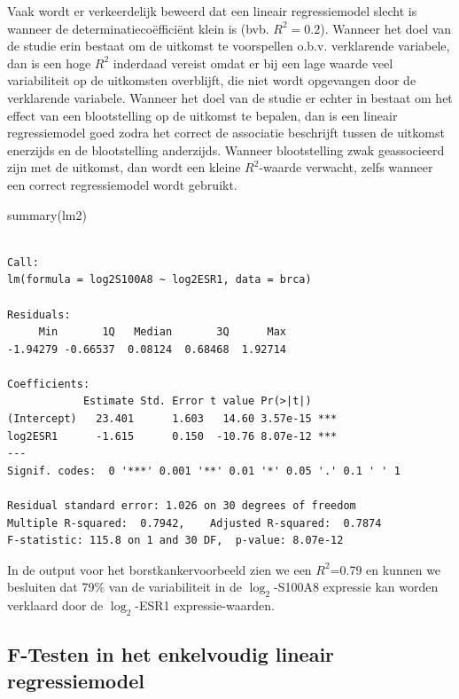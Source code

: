 \documentclass[
  dutch,
  letterpaper,
  12pt]{book}
\newenvironment{Shaded}{\begin{snugshade}}{\end{snugshade}}
\newcommand{\FunctionTok}[1]{\textcolor[rgb]{0.28,0.35,0.67}{#1}}
\newcommand{\NormalTok}[1]{\textcolor[rgb]{0.00,0.23,0.31}{#1}}
\theoremstyle{definition}
\theoremstyle{definition}
\theoremstyle{definition}
\theoremstyle{remark}
\begin{document}
Vaak wordt er verkeerdelijk beweerd dat een lineair regressiemodel
slecht is wanneer de determinatiecoëfficiënt klein is (bvb.
\(R^2=0.2\)). Wanneer het doel van de studie erin bestaat om de uitkomst
te voorspellen o.b.v. verklarende variabele, dan is een hoge \(R^2\)
inderdaad vereist omdat er bij een lage waarde veel variabiliteit op de
uitkomsten overblijft, die niet wordt opgevangen door de verklarende
variabele. Wanneer het doel van de studie er echter in bestaat om het
effect van een blootstelling op de uitkomst te bepalen, dan is een
lineair regressiemodel goed zodra het correct de associatie beschrijft
tussen de uitkomst enerzijds en de blootstelling anderzijds. Wanneer
blootstelling zwak geassocieerd zijn met de uitkomst, dan wordt een
kleine \(R^2\)-waarde verwacht, zelfs wanneer een correct regressiemodel
wordt gebruikt.

\begin{Shaded}
\begin{Highlighting}[]
\FunctionTok{summary}\NormalTok{(lm2)}
\end{Highlighting}
\end{Shaded}

\begin{verbatim}

Call:
lm(formula = log2S100A8 ~ log2ESR1, data = brca)

Residuals:
     Min       1Q   Median       3Q      Max 
-1.94279 -0.66537  0.08124  0.68468  1.92714 

Coefficients:
            Estimate Std. Error t value Pr(>|t|)    
(Intercept)   23.401      1.603   14.60 3.57e-15 ***
log2ESR1      -1.615      0.150  -10.76 8.07e-12 ***
---
Signif. codes:  0 '***' 0.001 '**' 0.01 '*' 0.05 '.' 0.1 ' ' 1

Residual standard error: 1.026 on 30 degrees of freedom
Multiple R-squared:  0.7942,    Adjusted R-squared:  0.7874 
F-statistic: 115.8 on 1 and 30 DF,  p-value: 8.07e-12
\end{verbatim}

In de output voor het borstkankervoorbeeld zien we een \(R^2\)=0.79 en
kunnen we besluiten dat 79\% van de variabiliteit in de
\(\log_2\)-S100A8 expressie kan worden verklaard door de \(\log_2\)-ESR1
expressie-waarden.

\subsection{F-Testen in het enkelvoudig lineair
regressiemodel}\label{f-testen-in-het-enkelvoudig-lineair-regressiemodel}
\end{document}
